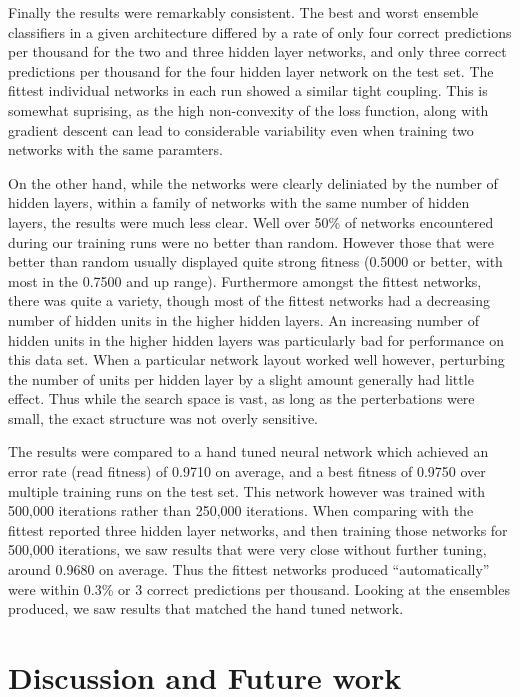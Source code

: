 \documentclass{article}
\DeclareMathOperator{\1}{\mathbbm{1}}
\begin{document}
Finally the results were remarkably consistent. The best and worst ensemble classifiers in a given architecture differed by
a rate of only four correct predictions per thousand for the two and three hidden layer networks, and only three correct
predictions per thousand for the four hidden layer network on the test set. The fittest individual networks in each run
showed a similar tight coupling. This is somewhat suprising, as the high non-convexity of the loss function, along with 
gradient descent can lead to considerable variability even when training two networks with the same paramters. 

On the other hand, while the networks were clearly deliniated by the number of hidden layers, within a family of networks
with the same number of hidden layers, the results were much less clear. Well over 50\% of networks encountered during our 
training runs were no better than random. However those that were better than random usually displayed quite strong fitness
(0.5000 or better, with most in the 0.7500 and up range). Furthermore amongst the fittest networks, there was quite a variety,
though most of the fittest networks had a decreasing number of hidden units in the higher hidden layers. An increasing number 
of hidden units in the higher hidden layers was particularly bad for performance on this data set. When a particular network layout
worked well however, perturbing the number of units per hidden layer by a slight amount generally had little effect. Thus while 
the search space is vast, as long as the perterbations were small, the exact structure was not overly sensitive.



The results were compared to a hand tuned neural network which achieved an error rate (read fitness) of 0.9710 on average, 
and a best fitness of 0.9750 over multiple training runs on the test set. This network however was trained with 500,000 iterations rather 
than 250,000 iterations. When comparing with the fittest reported three hidden layer networks, and then training those networks
for 500,000 iterations, we saw results that were very close without further tuning, around 0.9680 on average. Thus the fittest
networks produced ``automatically'' were within 0.3\% or 3 correct predictions per thousand. Looking at the ensembles produced,
we saw results that matched the hand tuned network. 


\section{Discussion and Future work}
\end{document}
